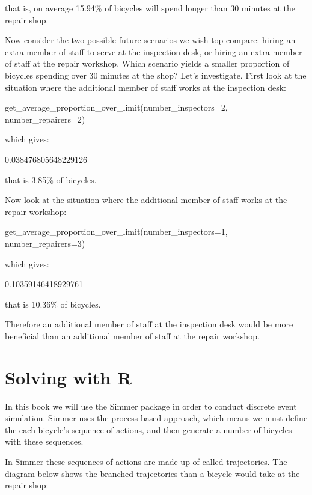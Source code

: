 that is, on average 15.94\% of bicycles will spend longer than 30 minutes at the
repair shop.

Now consider the two possible future scenarios we wish top compare: hiring an
extra member of staff to serve at the inspection desk, or hiring an extra member
of staff at the repair workshop. Which scenario yields a smaller proportion of
bicycles spending over 30 minutes at the shop? Let's investigate. First look at
the situation where the additional member of staff works at the inspection desk:

\begin{pyin}
get_average_proportion_over_limit(number_inspectors=2, number_repairers=2)
\end{pyin}

which gives:

\begin{pyout}
0.038476805648229126
\end{pyout}

that is 3.85\% of bicycles.

Now look at the situation where the additional member of staff works at the
repair workshop:

\begin{pyin}
get_average_proportion_over_limit(number_inspectors=1, number_repairers=3)
\end{pyin}

which gives:

\begin{pyout}
0.10359146418929761
\end{pyout}

that is 10.36\% of bicycles.

Therefore an additional member of staff at the inspection desk would be more
beneficial than an additional member of staff at the repair workshop.


\section{Solving with R}\label{sec:solving-with-R}

In this book we will use the Simmer package in order to conduct discrete event
simulation.
Simmer uses the process based approach, which means we must define the each
bicycle's sequence of actions, and then generate a number of bicycles with these
sequences.

In Simmer these sequences of actions are made up of called trajectories. The
diagram below shows the branched trajectories than a bicycle would take at the
repair shop:

